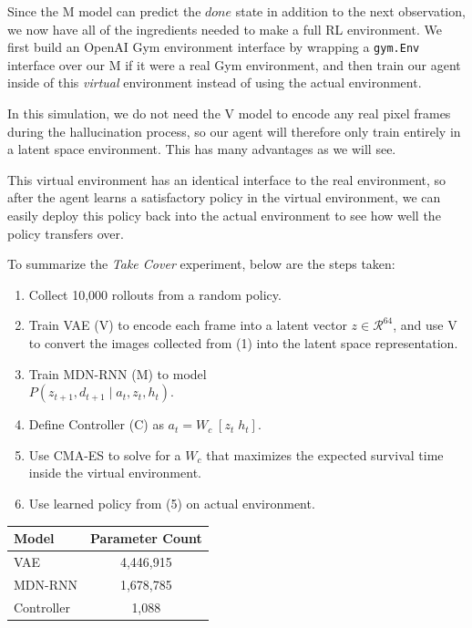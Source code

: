 \documentclass{article}
\begin{document}
Since the M model can predict the $done$ state in addition to the next observation, we now have all of the ingredients needed to make a full RL environment. We first build an OpenAI Gym environment interface by wrapping a \texttt{gym.Env} interface over our M if it were a real Gym environment, and then train our agent inside of this \textit{virtual} environment instead of using the actual environment.

In this simulation, we do not need the V model to encode any real pixel frames during the hallucination process, so our agent will therefore only train entirely in a latent space environment. This has many advantages as we will see.

This virtual environment has an identical interface to the real environment, so after the agent learns a satisfactory policy in the virtual environment, we can easily deploy this policy back into the actual environment to see how well the policy transfers over.

To summarize the \textit{Take Cover} experiment, below are the steps taken:

\begin{enumerate}
  \item Collect 10,000 rollouts from a random policy.
  \item Train VAE (V) to encode each frame into a latent vector $z \in \mathcal{R}^{64}$, and use V to convert the images collected from (1) into the latent space representation.
  \item  Train MDN-RNN (M) to model \\ $P(z_{t+1}, d_{t+1} \; | \; a_t, z_t, h_t)$.
  \item  Define Controller (C) as $a_t = W_c \; [z_t \; h_t]$.
  \item  Use CMA-ES to solve for a $W_c$ that maximizes the expected survival time inside the virtual environment.
  \item Use learned policy from (5) on actual environment.
\end{enumerate}

\begin{table}[ht]
\label{doom_cover_table}
\vskip -0.0in
\begin{center}
\begin{small}
\begin{sc}
\begin{tabular}{lc}
\toprule
Model & Parameter Count  \\
\midrule
VAE    & 4,446,915 \\
MDN-RNN & 1,678,785 \\
Controller    & 1,088 \\
\bottomrule
\end{tabular}
\end{sc}
\end{small}
\end{center}
\vskip -0.0in
\end{table}
\end{document}
